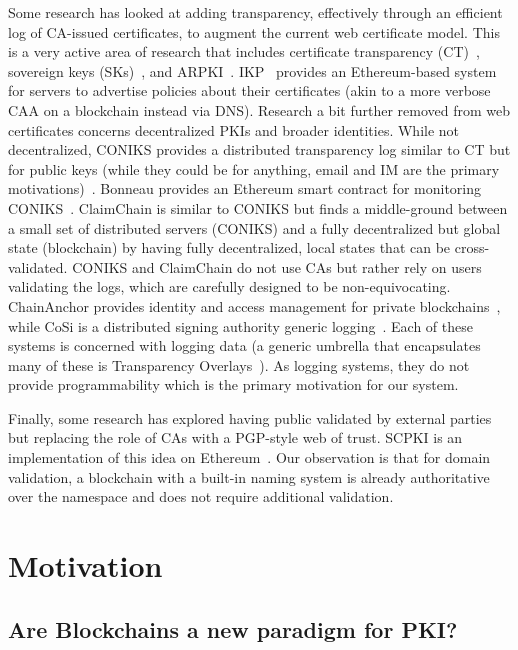Some research has looked at adding transparency, effectively through an efficient log of CA-issued certificates, to augment the current web certificate model. This is a very active area of research that includes certificate transparency (CT)~\cite{laurie2014certificate}, sovereign keys (SKs)~\cite{giteffor4:online}, and ARPKI~\cite{basin2014arpki}. IKP~\cite{matsumoto2016ikp} provides an Ethereum-based system for servers to advertise policies about their certificates (akin to a more verbose CAA on a blockchain instead via DNS). Research a bit further removed from web certificates concerns decentralized PKIs and broader identities. While not decentralized, CONIKS provides a distributed transparency log similar to CT but for public keys (while they could be for anything, email and IM are the primary motivations)~\cite{melara2015coniks}. Bonneau provides an Ethereum smart contract for monitoring CONIKS~\cite{bonneau2016ethiks}. ClaimChain is similar to CONIKS but finds a middle-ground between a small set of distributed servers (CONIKS) and a fully decentralized but global state (blockchain) by having fully decentralized, local states that can be cross-validated. CONIKS and ClaimChain do not use CAs but rather rely on users validating the logs, which are carefully designed to be non-equivocating. ChainAnchor provides identity and access management for private blockchains~\cite{hardjonoverifiable}, while CoSi is a distributed signing authority generic logging~\cite{syta2016keeping}. Each of these systems is concerned with logging data (a generic umbrella that encapsulates many of these is Transparency Overlays~\cite{chase2016transparency}). As logging systems, they do not provide programmability which is the primary motivation for our system. 

Finally, some research has explored having public validated by external parties but replacing the role of CAs with a PGP-style web of trust. SCPKI is an implementation of this idea on Ethereum~\cite{al2017scpki}. Our observation is that for domain validation, a blockchain with a built-in naming system is already authoritative over the namespace and does not require additional validation. 


\section{Motivation}

\subsection{Are Blockchains a new paradigm for PKI?}


